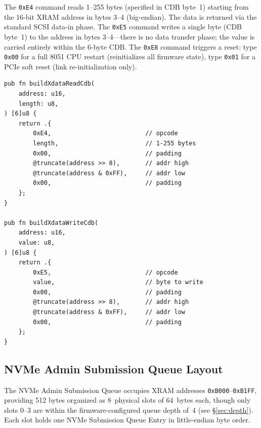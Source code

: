 \documentclass[conference]{IEEEtran}
\begin{document}
The \texttt{0xE4} command reads 1--255 bytes (specified in CDB byte~1)
starting from the 16-bit XRAM address in bytes 3--4 (big-endian).
The data is returned via the standard SCSI data-in phase. The
\texttt{0xE5} command writes a single byte (CDB byte~1) to the address
in bytes 3--4---there is no data transfer phase; the value is carried
entirely within the 6-byte CDB. The \texttt{0xE8} command triggers a
reset: type \texttt{0x00} for a full 8051 CPU restart (reinitializes
all firmware state), type \texttt{0x01} for a PCIe soft reset (link
re-initialization only).

\begin{lstlisting}[language=Zig,caption={XDATA Read and Write CDB
builders.},label={lst:cdb-builders}]
pub fn buildXdataReadCdb(
    address: u16,
    length: u8,
) [6]u8 {
    return .{
        0xE4,                          // opcode
        length,                        // 1-255 bytes
        0x00,                          // padding
        @truncate(address >> 8),       // addr high
        @truncate(address & 0xFF),     // addr low
        0x00,                          // padding
    };
}

pub fn buildXdataWriteCdb(
    address: u16,
    value: u8,
) [6]u8 {
    return .{
        0xE5,                          // opcode
        value,                         // byte to write
        0x00,                          // padding
        @truncate(address >> 8),       // addr high
        @truncate(address & 0xFF),     // addr low
        0x00,                          // padding
    };
}
\end{lstlisting}


\subsection{NVMe Admin Submission Queue Layout}
\label{sec:sq-layout}

The NVMe Admin Submission Queue occupies XRAM addresses
\texttt{0xB000}--\texttt{0xB1FF}, providing 512 bytes organized as
8~physical slots of 64~bytes each, though only slots 0--3 are within the
firmware-configured queue depth of~4 (see \S\ref{sec:depth}). Each
slot holds one NVMe Submission Queue Entry in little-endian byte order.
\end{document}
